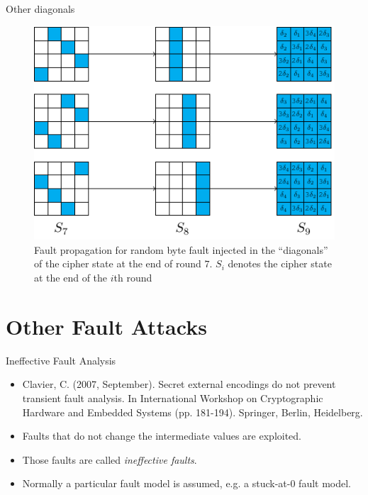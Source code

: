 \begin{frame}{Other diagonals}
\begin{figure}
    \centering
    \includegraphics{fig/AES_DFA_all_diagonals.pdf}
    \caption{Fault propagation for random byte fault injected in the ``diagonals'' of the cipher state at the end of round $7$.
    $S_i$ denotes the cipher state at the end of the $i$th round}
\end{figure}
\end{frame}

\section{Other Fault Attacks}
\begin{frame}{\VideoName}
    \tableofcontents[currentsection]
\end{frame}

\begin{frame}{Ineffective Fault Analysis}
    \begin{itemize}
        \item Clavier, C. (2007, September). Secret external encodings do not prevent transient fault analysis. In International Workshop on Cryptographic Hardware and Embedded Systems (pp. 181-194). Springer, Berlin, Heidelberg. 
        \item Faults that do not change the intermediate values are exploited.
        \item Those faults are called \textit{ineffective faults}.
        \item Normally a particular fault model is assumed, e.g. a stuck-at-$0$ fault model.
    \end{itemize}
\end{frame}

